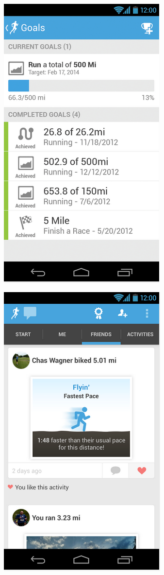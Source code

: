 \documentclass[a4paper,12pt]{article}
\begin{document}
\begin{figure}[!ht]
\centering
\begin{minipage}{.5\textwidth}
  \centering
  \includegraphics[width=.6\linewidth]{./images/application-runkeeper-goals}
  \label{application-runkeeper-achievements}
\end{minipage}%
\begin{minipage}{.5\textwidth}
  \centering
  \includegraphics[width=.6\linewidth]{./images/application-runkeeper-socialnetworking}

\end{minipage}
\end{figure}
\end{document}
